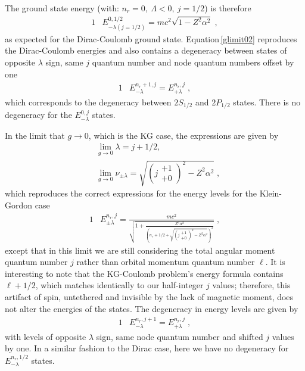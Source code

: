 The ground state energy (with: $n_{r}=0,\ \Lambda<0,\ j=1/2$) is therefore
\begin{alignat}{1}
\label{glimit07} &E^{0,1/2}_{-\lambda(j=1/2)}=mc^{2}\sqrt{1-Z^{2}\alpha^{2}}\;,\end{alignat}
as expected for the Dirac-Coulomb ground state. Equation\,\eqref{glimit02} reproduces the Dirac-Coulomb energies and also contains a degeneracy between states of opposite $\lambda$ sign, same $j$ quantum number and node quantum numbers offset by one
\begin{alignat}{1}
\label{glimit03} &E^{n_{r}+1,j}_{-\lambda}=E^{n_{r},j}_{+\lambda}\;,\end{alignat}
which corresponds to the degeneracy between $2S_{1/2}$ and $2P_{1/2}$ states. There is no degeneracy for the $E^{0,j}_{-\lambda}$ states. 

In the limit that $g\rightarrow 0$, which is the KG case, the expressions are given by
\begin{subequations}
\begin{alignat}{1}
\label{glimit04} &\lim_{g\rightarrow0}\lambda=j+1/2,\\
&\lim_{g\rightarrow0}\nu_{\pm\lambda}=\sqrt{\left(j\begin{smallmatrix} +1 \\ +0 \end{smallmatrix}\right)^{2}-Z^{2}\alpha^{2}}\;,
\end{alignat}
\end{subequations}
which reproduces the correct expressions for the energy levels for the Klein-Gordon case 
\begin{alignat}{1}
\label{glimit05} &E_{\pm\lambda}^{n_{r},j}=\frac{mc^{2}}{\sqrt{1+\displaystyle\frac{Z^{2}\alpha^{2}}{\left(n_{r}+1/2+\displaystyle\sqrt{\left(j\begin{smallmatrix} +1 \\ +0 \end{smallmatrix}\right)^{2}-Z^{2}\alpha^{2}}\right)^{2}}}}\;,\end{alignat}
except that in this limit we are still considering the total angular moment quantum number $j$ rather than orbital momentum quantum number $\ell$. It is interesting to note that the KG-Coulomb problem\rq s energy formula contains $\ell+1/2$, which matches identically to our half-integer $j$ values; therefore, this artifact of spin, untethered and invisible by the lack of magnetic moment, does not alter the energies of the states. The degeneracy in energy levels are given by 
\begin{alignat}{1}
\label{glimit06} &E^{n_{r},j+1}_{-\lambda}=E^{n_{r},j}_{+\lambda}\;,\end{alignat}
with levels of opposite $\lambda$ sign, same node quantum number and shifted $j$ values by one. In a similar fashion to the Dirac case, here we have no degeneracy for $E^{n_{r},1/2}_{-\lambda}$ states.

